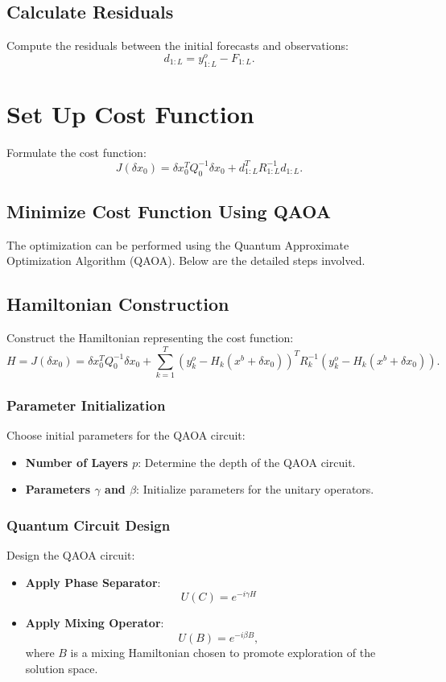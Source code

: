 \documentclass{article}
\begin{document}
\subsection{Calculate Residuals}
Compute the residuals between the initial forecasts and observations:
\[
    d_{1:L} = y_{1:L}^o - F_{1:L}.
\]

\section{Set Up Cost Function}
Formulate the cost function:
\[
    J(\delta x_0) = \delta x_0^T Q_0^{-1} \delta x_0 + d_{1:L}^T R_{1:L}^{-1} d_{1:L}.
\]

\subsection{Minimize Cost Function Using QAOA}

The optimization can be performed using the Quantum Approximate Optimization Algorithm (QAOA). Below are the detailed steps involved.

\subsection{Hamiltonian Construction}
Construct the Hamiltonian representing the cost function:
\[
    H = J(\delta x_0) = \delta x_0^T Q_0^{-1} \delta x_0 + \sum_{k=1}^{T} (y_k^o - H_k(x^b + \delta x_0))^T R_k^{-1} (y_k^o - H_k(x^b + \delta x_0)).
\]

\subsubsection{Parameter Initialization}
Choose initial parameters for the QAOA circuit:
\begin{itemize}
    \item \textbf{Number of Layers \(p\)}: Determine the depth of the QAOA circuit.
    \item \textbf{Parameters \(\gamma\) and \(\beta\)}: Initialize parameters for the unitary operators.
\end{itemize}

\subsubsection{Quantum Circuit Design}
Design the QAOA circuit:
\begin{itemize}
    \item \textbf{Apply Phase Separator}:
    \[
        U(C) = e^{-i \gamma H}
    \]

    \item \textbf{Apply Mixing Operator}:
    \[
        U(B) = e^{-i \beta B},
    \]
    where \(B\) is a mixing Hamiltonian chosen to promote exploration of the solution space.
\end{itemize}
\end{document}
